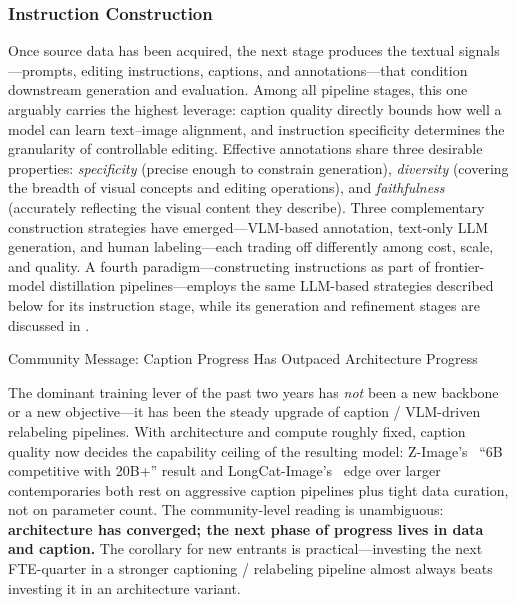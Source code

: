 \documentclass{llmxive}
\begin{document}
\subsubsection{Instruction Construction}\label{sec:instruction}

Once source data has been acquired, the next stage produces the textual signals---prompts, editing instructions, captions, and annotations---that condition downstream generation and evaluation. Among all pipeline stages, this one arguably carries the highest leverage: caption quality directly bounds how well a model can learn text--image alignment, and instruction specificity determines the granularity of controllable editing. Effective annotations share three desirable properties: \emph{specificity} (precise enough to constrain generation), \emph{diversity} (covering the breadth of visual concepts and editing operations), and \emph{faithfulness} (accurately reflecting the visual content they describe). Three complementary construction strategies have emerged---VLM-based annotation, text-only LLM generation, and human labeling---each trading off differently among cost, scale, and quality. A fourth paradigm---constructing instructions as part of frontier-model distillation pipelines---employs the same LLM-based strategies described below for its instruction stage, while its generation and refinement stages are discussed in .

\begin{highlightbox}{Community Message: Caption Progress Has Outpaced Architecture Progress}

The dominant training lever of the past two years has \emph{not} been a new backbone or a new objective---it has been the steady upgrade of caption / VLM-driven relabeling pipelines. With architecture and compute roughly fixed, caption quality now decides the capability ceiling of the resulting model: Z-Image's~\citep{cai2025z} ``6B competitive with 20B+'' result and LongCat-Image's~\citep{team2025longcat} edge over larger contemporaries both rest on aggressive caption pipelines plus tight data curation, not on parameter count. The community-level reading is unambiguous: \textbf{architecture has converged; the next phase of progress lives in data and caption.} The corollary for new entrants is practical---investing the next FTE-quarter in a stronger captioning / relabeling pipeline almost always beats investing it in an architecture variant.
\end{highlightbox}
\end{document}
